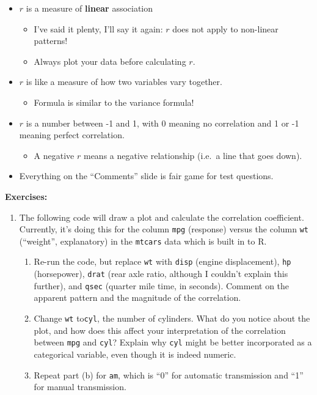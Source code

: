 \documentclass[
  letterpaper,
  DIV=11,
  numbers=noendperiod,
  oneside]{scrreprt}
\providecommand{\tightlist}{%
  \setlength{\itemsep}{0pt}\setlength{\parskip}{0pt}}\usepackage{longtable,booktabs,array}
\begin{document}
\begin{itemize}
\tightlist
\item
  \(r\) is a measure of \textbf{linear} association

  \begin{itemize}
  \tightlist
  \item
    I've said it plenty, I'll say it again: \(r\) does not apply to
    non-linear patterns!
  \item
    Always plot your data before calculating \(r\).
  \end{itemize}
\item
  \(r\) is like a measure of how two variables vary together.

  \begin{itemize}
  \tightlist
  \item
    Formula is similar to the variance formula!
  \end{itemize}
\item
  \(r\) is a number between -1 and 1, with 0 meaning no correlation and
  1 or -1 meaning perfect correlation.

  \begin{itemize}
  \tightlist
  \item
    A negative \(r\) means a negative relationship (i.e.~a line that
    goes down).
  \end{itemize}
\item
  Everything on the ``Comments'' slide is fair game for test questions.
\end{itemize}

\textbf{Exercises:}

\begin{enumerate}
\def\labelenumi{\arabic{enumi}.}
\tightlist
\item
  The following code will draw a plot and calculate the correlation
  coefficient. Currently, it's doing this for the column \texttt{mpg}
  (response) versus the column \texttt{wt} (``weight'', explanatory) in
  the \texttt{mtcars} data which is built in to R.

  \begin{enumerate}
  \def\labelenumii{\alph{enumii}.}
  \tightlist
  \item
    Re-run the code, but replace \texttt{wt} with \texttt{disp} (engine
    displacement), \texttt{hp} (horsepower), \texttt{drat} (rear axle
    ratio, although I couldn't explain this further), and \texttt{qsec}
    (quarter mile time, in seconds). Comment on the apparent pattern and
    the magnitude of the correlation.
  \item
    Change \texttt{wt} to\texttt{cyl}, the number of cylinders. What do
    you notice about the plot, and how does this affect your
    interpretation of the correlation between \texttt{mpg} and
    \texttt{cyl}? Explain why \texttt{cyl} might be better incorporated
    as a categorical variable, even though it is indeed numeric.
  \item
    Repeat part (b) for \texttt{am}, which is ``0'' for automatic
    transmission and ``1'' for manual transmission.
  \end{enumerate}
\end{enumerate}
\end{document}
